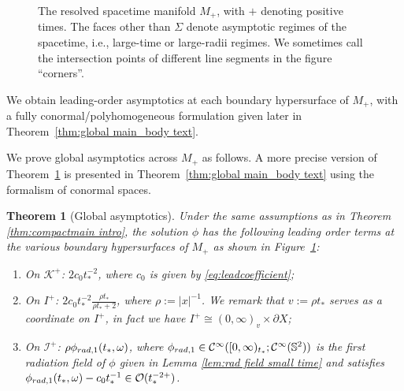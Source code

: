 \documentclass[10pt,a4paper,reqno]{amsart}
\newcommand{\CI}{\mathcal{C}^\infty}
\renewcommand{\S}{{\mathbb S}}
\newtheorem{theorem}{Theorem}[section]
\theoremstyle{definition}
\theoremstyle{remark}
\numberwithin{equation}{section}
\newcommand{\calK}{\mathcal K}
\newcommand{\ts}{t_*}
\begin{document}
\begin{figure}[ht]
\caption{The resolved spacetime manifold $M_+$, with $+$ denoting positive times. The faces other than $\Sigma$ denote asymptotic regimes of the spacetime, i.e., large-time or large-radii regimes. We sometimes call the intersection points of different line segments in the figure ``corners''.}
\label{fig:M+}
\end{figure}

We obtain leading-order asymptotics at each boundary hypersurface of $M_+$, with a fully conormal/polyhomogeneous formulation given later in Theorem~\ref{thm:global main_body text}.


We prove global asymptotics across $M_+$ as follows. A more precise version of Theorem~\ref{thm:global main} is presented in Theorem~\ref{thm:global main_body text} using the formalism of conormal spaces.
\begin{theorem}[Global asymptotics]\label{thm:global main}
Under the same assumptions as in Theorem \ref{thm:compactmain intro}, the solution $\phi$ has the following leading order terms at the various boundary hypersurfaces of $M_+$ as shown in Figure~\ref{fig:M+}:
\begin{enumerate}
\item On $\calK^+$: $2c_0 t_*^{-2}$, where $c_0$ is given by \eqref{eq:leadcoefficient};

\item On $I^+$: $2c_0 t_*^{-2} \frac{\rho t_*}{\rho t_* + 2}$, where $\rho:=|x|^{-1}$. We remark that $v:=\rho\ts$ serves as a coordinate on $I^+$, in fact we have $I^+\cong (0,\infty)_v \times\partial X$;

\item On $\mathscr{I}^+$: $\rho\phi_{\rm rad,1}(\ts,\omega)$, where $\phi_{\rm rad,1}\in \CI([0,\infty)_{t_*};\CI(\S^2))$ is the first radiation field of $\phi$ given in Lemma \ref{lem:rad field small time} and satisfies $\phi_{\rm rad,1}(\ts,\omega) - c_0 \ts^{-1} \in \mathcal{O}(\ts^{-2+})$.
\end{enumerate}
\end{theorem}
\end{document}
